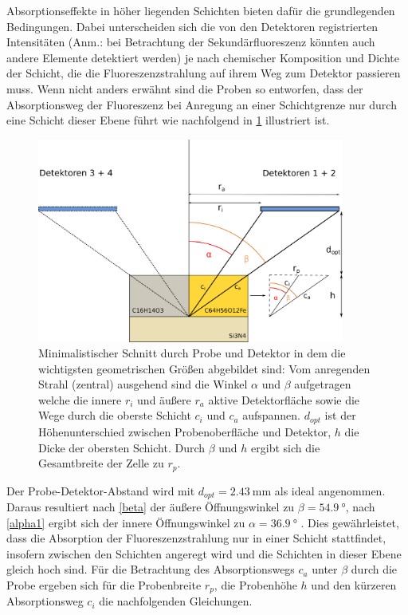 Absorptionseffekte in höher liegenden Schichten bieten dafür die grundlegenden Bedingungen. Dabei unterscheiden sich die von den Detektoren registrierten Intensitäten (Anm.: bei Betrachtung der Sekundärfluoreszenz könnten auch andere Elemente detektiert werden) je nach chemischer Komposition und Dichte der Schicht, die die Fluoreszenzstrahlung auf ihrem Weg zum Detektor passieren muss. Wenn nicht anders erwähnt sind die Proben so entworfen, dass der Absorptionsweg der Fluoreszenz bei Anregung an einer Schichtgrenze nur durch eine Schicht dieser Ebene führt wie nachfolgend in \cref{fig:strahlengang} illustriert ist.  
\begin{figure}[H] 
  \centering
     \includegraphics[width=0.9\textwidth]{illustrations/durchzelle.png}
  \caption[Minimalistischer Schnitt durch Probe und Detektor]{Minimalistischer Schnitt durch Probe und Detektor in dem die wichtigsten geometrischen Größen abgebildet sind:  Vom anregenden Strahl (zentral) ausgehend sind die Winkel $\alpha$ und $\beta$ aufgetragen welche die innere $r_i$ und äußere $r_a$ aktive Detektorfläche sowie die Wege durch die oberste Schicht $c_i$ und $c_a$ aufspannen. $d_{opt}$ ist der Höhenunterschied zwischen Probenoberfläche und Detektor, $h$ die Dicke der obersten Schicht. Durch $\beta$ und $h$ ergibt sich die Gesamtbreite der Zelle zu $r_p$.}
  \label{fig:strahlengang}
\end{figure}
Der Probe-Detektor-Abstand wird mit $d_{opt}=\SI{2.43}{\milli\meter}$ als ideal angenommen. Daraus resultiert nach \cref{beta} der äußere Öffnungswinkel zu $\beta = \SI{54.9}{\degree}$, nach \cref{alpha1} ergibt sich der innere Öffnungswinkel zu $\alpha = \SI{36.9}{\degree}$ . Dies gewährleistet, dass die Absorption der Fluoreszenzstrahlung nur in einer Schicht stattfindet, insofern zwischen den Schichten angeregt wird und die Schichten in dieser Ebene gleich hoch sind. Für die Betrachtung des Absorptionswegs $c_a$ unter $\beta$ durch die Probe ergeben sich für die Probenbreite $r_{p}$, die Probenhöhe $h$ und den kürzeren Absorptionsweg $c_i$ die nachfolgenden Gleichungen.

